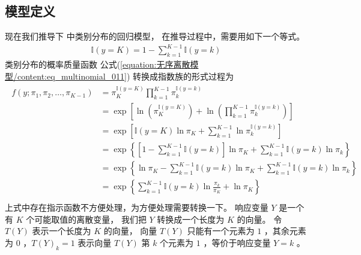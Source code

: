 \documentclass[letterpaper,10pt,english]{sphinxmanual}
\begin{document}
\subsection{模型定义}
\label{\detokenize{_u65e0_u5e8f_u79bb_u6563_u6a21_u578b/content:id3}}
现在我们推导下  中类别分布的回归模型，
在推导过程中，需要用如下一个等式。
\begin{equation}\label{equation:无序离散模型/content:无序离散模型/content:6}
\begin{split}{\mathbb{I}(y=K)} = 1 - \sum_{k=1}^{K-1} {\mathbb{I}(y=k)}\end{split}
\end{equation}
类别分布的概率质量函数 公式(\ref{equation:无序离散模型/content:eq_multinomial_011}) 转换成指数族的形式过程为
\begin{align}\label{equation:无序离散模型/content:eq_multinomial_020}\!\begin{aligned}
f(y;\pi_1,\pi_2,\dots,\pi_{K-1})
&= \pi_K^{\mathbb{I}(y=K)} \prod_{k=1}^{K-1} \pi_k^{\mathbb{I}(y=k)}\\
&= \exp \left [
\ln \left ( \pi_K^{\mathbb{I}(y=K)}  \right )+
\ln \left (   \prod_{k=1}^{K-1} \pi_k^{\mathbb{I}(y=k)}     \right    )
\right ]\\
&= \exp \left [
{\mathbb{I}(y=K)} \ln  \pi_K   +
 \sum_{k=1}^{K-1} \ln     \pi_k^{{\mathbb{I}(y=k)}}
\right ]\\
&= \exp \left \{
\left [ 1 - \sum_{k=1}^{K-1} {\mathbb{I}(y=k)} \right ] \ln \pi_K  +
  \sum_{k=1}^{K-1}  {\mathbb{I}(y=k)} \ln   \pi_k
\right \}\\
&= \exp \left \{
 \ln \pi_K
 - \sum_{k=1}^{K-1} {\mathbb{I}(y=k)}  \ln  \pi_K
 + \sum_{k=1}^{K-1}  {\mathbb{I}(y=k)} \ln   \pi_k
\right \}\\
&= \exp \left \{
\sum_{k=1}^{K-1} {\mathbb{I}(y=k)}  \ln \frac{\pi_k}{\pi_K}
+\ln \pi_K
\right \}\\
\end{aligned}\end{align}
上式中存在指示函数不方便处理，为方便处理需要转换一下。
响应变量 \(Y\) 是一个有 \(K\) 个可能取值的离散变量，
我们把 \(Y\) 转换成一个长度为 \(K\) 的向量。
令 \(T(Y)\) 表示一个长度为 \(K\) 的向量，
向量 \(T(Y)\) 只能有一个元素为 \(1\) ，其余元素为 \(0\)
，\(T(Y)_k=1\) 表示向量 \(T(Y)\) 第 \(k\) 个元素为 \(1\)
，等价于响应变量 \(Y=k\) 。
\end{document}
